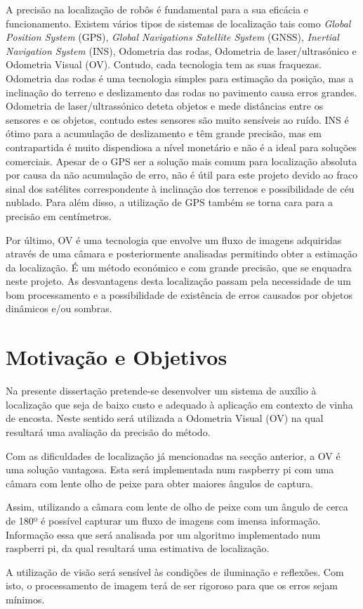 A precisão na localização de robôs é fundamental para a sua eficácia e funcionamento. Existem vários tipos de sistemas de localização tais como \textit{Global Position System} (GPS), \textit{Global Navigations Satellite System} (GNSS), \textit{Inertial Navigation System} (INS), Odometria das rodas, Odometria de laser/ultrasónico e Odometria Visual (OV). Contudo, cada tecnologia tem as suas fraquezas. Odometria das rodas é uma tecnologia simples para estimação da posição, mas a inclinação do terreno e deslizamento das rodas no pavimento causa erros grandes. Odometria de  laser/ultrassónico  deteta objetos e mede distâncias entre os sensores e os objetos, contudo estes sensores são muito sensíveis ao ruído. INS é ótimo para a acumulação de deslizamento e têm grande precisão, mas em contrapartida é muito dispendiosa a nível monetário e não é a ideal para soluções comerciais. Apesar de o GPS  ser a solução mais comum para localização absoluta por causa da não acumulação de erro, não é útil para este projeto devido ao fraco sinal dos satélites correspondente à inclinação dos terrenos e possibilidade de céu nublado. Para além disso, a utilização de GPS também se torna cara para a precisão em centímetros. \cite{Aqel2016}

Por último, OV é uma tecnologia que envolve um fluxo de imagens adquiridas através de uma câmara e posteriormente analisadas permitindo obter a estimação da localização. É um método económico e com grande precisão, que se enquadra neste projeto. As desvantagens desta localização passam pela necessidade de um bom processamento e a possibilidade de existência de erros causados por objetos dinâmicos e/ou sombras.

\section{Motivação e Objetivos} \label{sec:context}

Na presente dissertação pretende-se desenvolver um sistema de auxílio à localização que seja de baixo custo e adequado à aplicação em contexto de vinha de encosta. Neste sentido será utilizada a Odometria Visual (OV) na qual resultará uma avaliação da precisão do método.


Com as dificuldades de localização já mencionadas na secção anterior, a  OV é uma solução vantagosa. Esta será implementada num raspberry pi com uma câmara com lente olho de peixe para obter maiores ângulos de captura.

Assim, utilizando a câmara com lente de olho de peixe com um ângulo de cerca de 180º é possível capturar um fluxo de imagens com imensa informação. Informação essa que será analisada por um algoritmo implementado num raspberri pi, da qual resultará uma estimativa de localização.

A utilização de visão será sensível às condições de iluminação e reflexões. Com isto, o processamento de imagem terá de ser rigoroso para que os erros sejam mínimos.




